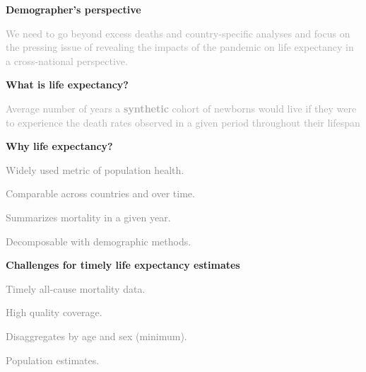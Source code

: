 \documentclass[xcolor={dvipsnames}]{beamer}
\begin{document}
\begin{frame}
	\begin{center}
		\LARGE{\textbf{Demographer's perspective}} \linebreak
		
\Large{\textcolor{darkgray}{We need to go beyond excess deaths and country-specific analyses and focus on the pressing issue of revealing the impacts of the pandemic on life expectancy in a cross-national perspective.}}
	\end{center}			
\end{frame}


\begin{frame}
	\begin{center}
		\LARGE{\textbf{What is life expectancy?}} \pause \linebreak
	
\Large{\textcolor{darkgray}{Average number of years a \textbf{synthetic} cohort of newborns would live if they were to experience the death rates observed in a given period throughout their lifespan}} 

	\end{center}
			
\end{frame}


\begin{frame}
	\begin{center}
		\LARGE{\textbf{Why life expectancy?}} \pause \linebreak
	
	\end{center}
		\begin{itemize}
	\Large{
	\item \textcolor{gray}{Widely used metric of population health.}
	\item \textcolor{gray}{Comparable across countries and over time.}
	\item \textcolor{gray}{Summarizes mortality in a given year.}
	\item \textcolor{gray}{Decomposable with demographic methods.}
	}
	\end{itemize}
\end{frame}


\begin{frame}
	\begin{center}
		\LARGE{\textbf{Challenges for timely life expectancy estimates}} \pause \linebreak
	
	\end{center}
		\begin{itemize}
	\Large{
	\item \textcolor{gray}{Timely all-cause mortality data.}
	\item \textcolor{gray}{High quality coverage.}
	\item \textcolor{gray}{Disaggregates by age and sex (minimum).}
	\item \textcolor{gray}{Population estimates.}
	}
	\end{itemize}
\end{frame}
\end{document}
